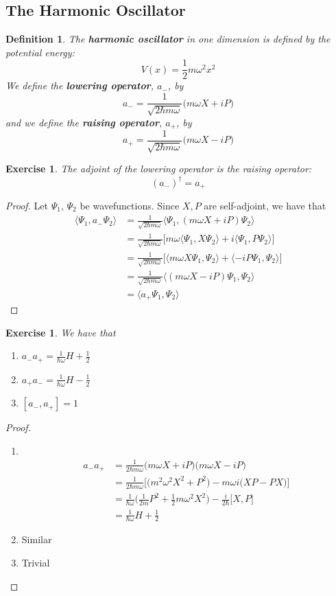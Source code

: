 \documentclass[12pt]{amsart}
\newtheorem{defn}[thm]{Definition}
\newtheorem{ex}[thm]{Exercise}
\renewcommand{\r}{\rangle}
\renewcommand{\l}{\langle}
\newcommand{\om}{\omega}
\begin{document}
\subsection{The Harmonic Oscillator}

\begin{defn}
The \textbf{harmonic oscillator} in one dimension is defined by the potential energy: $$V(x) = \frac{1}{2}m \om^2 x^2$$ We define the \textbf{lowering operator}, $a_-$, by $$a_- = \frac{1}{\sqrt{2 \hbar m \om }}\bigg(m\om X +iP\bigg)$$  and we define the \textbf{raising operator}, $a_+$, by $$a_+ = \frac{1}{\sqrt{2 \hbar m \om }}\bigg(m\om X -iP\bigg)$$
\end{defn}

\begin{ex}
The adjoint of the lowering operator is the raising operator: $$(a_-)^{\dagger} = a_+$$
\end{ex}

\begin{proof}
Let $\Psi_1$, $\Psi_2$ be wavefunctions. Since $X,P$ are self-adjoint, we have that
\begin{align*}
\l \Psi_1 , a_- \Psi_2\r
&= \frac{1}{\sqrt{2 \hbar m \om}} \l\Psi_1 , (m\om X +iP) \Psi_2 \r \\
&= \frac{1}{\sqrt{2 \hbar m \om}}\bigg[ m \om \l\Psi_1 , X \Psi_2 \r +i \l \Psi_1 ,  P \Psi_2 \r \bigg] \\
&= \frac{1}{\sqrt{2 \hbar m \om}}\bigg[  \l m \om X \Psi_1 , \Psi_2 \r + \l -i P \Psi_1 , \Psi_2 \r \bigg] \\
&= \frac{1}{\sqrt{2 \hbar m \om}}  \l (m \om X -iP)\Psi_1 , \Psi_2 \r  \\
&= \l a_+ \Psi_1 , \Psi_2\r 
\end{align*}
\end{proof}

\begin{ex}
We have that 
\begin{enumerate}
\item $a_-a_+ = \frac{1}{\hbar \om}H + \frac{1}{2}$
\item $a_+a_- = \frac{1}{\hbar \om}H - \frac{1}{2}$
\item $[a_-,a_+] = 1$
\end{enumerate}
\end{ex}

\begin{proof}
\begin{enumerate}
\item \
\begin{align*}
a_- a_+
&= \frac{1}{2\hbar m \om}\big(m \om X + iP \big) \big( m\om X - iP )\\
&= \frac{1}{2 \hbar m \om} \bigg[ \big(m^2 \om^2 X^2 + P^2 \big) - m\om i\big(XP - PX \big) \bigg]\\
&= \frac{1}{\hbar \om}\big(\frac{1}{2m}P^2 + \frac{1}{2}m \om^2 X^2 \big) - \frac{i}{2 \hbar}\big[X,P \big]\\
&= \frac{1}{\hbar \om}H + \frac{1}{2}
\end{align*}
\item Similar
\item Trivial
\end{enumerate}
\end{proof}
\end{document}
